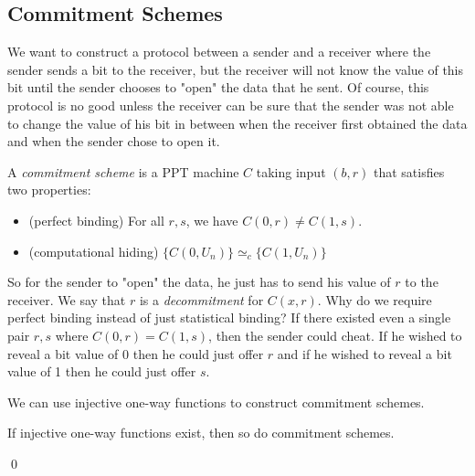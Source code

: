 \subsection{Commitment Schemes}

We want to construct a protocol between a sender and a receiver where the sender sends a bit to the receiver, but the receiver will not know the value of this bit until the sender chooses to "open" the data that he sent. Of course, this protocol is no good unless the receiver can be sure that the sender was not able to change the value of his bit in between when the receiver first obtained the data and when the sender chose to open it.

\begin{definition}
A \emph{commitment scheme} is a PPT machine $C$ taking input $(b,r)$ that satisfies two properties: \begin{itemize}
\item (perfect binding) For all $r, s$, we have $C(0,r) \neq C(1,s)$.

\item (computational hiding) $\{ C(0, U_n) \} \simeq_c \{ C(1, U_n) \}$

\end{itemize}
\end{definition}

So for the sender to "open" the data, he just has to send his value of $r$ to the receiver. We say that $r$ is a \emph{decommitment} for $C(x,r)$. Why do we require perfect binding instead of just statistical binding? If there existed even a single pair $r, s$ where $C(0,r) = C(1,s)$, then the sender could cheat. If he wished to reveal a bit value of 0 then he could just offer $r$ and if he wished to reveal a bit value of 1 then he could just offer $s$.

We can use injective one-way functions to construct commitment schemes.

\begin{theorem}
If injective one-way functions exist, then so do commitment schemes.
\end{theorem}
\qed

